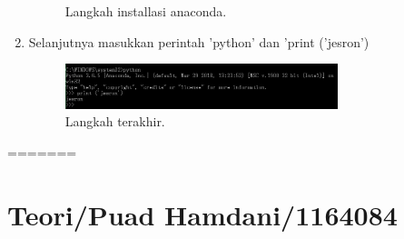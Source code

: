 \begin{enumerate}
\begin{figure}[ht]
\caption{Langkah installasi anaconda.}
\end{figure}
\item  Selanjutnya masukkan perintah 'python' dan 'print ('jesron')
\begin{figure}[ht]
\centerline{\includegraphics[width=0.75\textwidth]{figures/4.JPEG}}
\caption{Langkah terakhir.}
\end{figure}
\end{enumerate}



=======
\section{Teori/Puad Hamdani/1164084}

